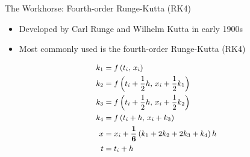 \documentclass{beamer}
\newcommand{\functionof}[2]{#1\left(#2\right)}
\newcommand{\paren}[1]{\left(#1\right)}
\begin{document}
\begin{frame}{The Workhorse: Fourth-order Runge-Kutta (RK4)}
\begin{minipage}{0.5\linewidth}
    \begin{itemize}
        \item Developed by Carl Runge and Wilhelm Kutta in early 1900s
        \item Most commonly used is the fourth-order Runge-Kutta (RK4)
    \end{itemize}
\end{minipage}%
\begin{minipage}{0.5\linewidth}
\begin{equation}
\small
\begin{aligned}
    k_1 &= \functionof{f}{t_i,\, x_i}\\
    k_2 &= \functionof{f}{t_i + \dfrac{1}{2}h,\, x_i + \dfrac{1}{2}k_1}\\
    k_3 &= \functionof{f}{t_i + \dfrac{1}{2}h,\, x_i + \dfrac{1}{2}k_2}\\
    k_4 &= \functionof{f}{       t_i + h,\,        x_i + k_3}\\
    x   &= x_i + \mathbf{\dfrac{1}{6}}\paren{k_1 + 2k_2 + 2k_3 + k_4}h\\
    t   &= t_i + h
\end{aligned}
\end{equation}
\end{minipage}


\end{frame}
\end{document}
